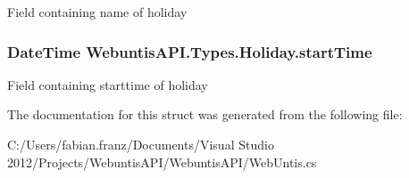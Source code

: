 Field containing name of holiday \hypertarget{struct_webuntis_a_p_i_1_1_types_1_1_holiday_a489a91e746530bfed3300c39533297f1}{
\subsubsection[{start\-Time}]{\setlength{\rightskip}{0pt plus 5cm}Date\-Time Webuntis\-A\-P\-I.\-Types.\-Holiday.\-start\-Time}}\label{struct_webuntis_a_p_i_1_1_types_1_1_holiday_a489a91e746530bfed3300c39533297f1}
Field containing starttime of holiday 

The documentation for this struct was generated from the following file\-:\begin{DoxyCompactItemize}
\item 
C\-:/\-Users/fabian.\-franz/\-Documents/\-Visual Studio 2012/\-Projects/\-Webuntis\-A\-P\-I/\-Webuntis\-A\-P\-I/Web\-Untis.\-cs\end{DoxyCompactItemize}
